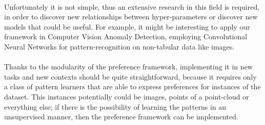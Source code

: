 \paragraph{}
Unfortunately it is not simple, thus an extensive research in this field is required, in order to discover new relationships between hyper-parameters or discover new models that could be useful. \newline
For example, it might be interesting to apply our framework in Computer Vision Anomaly Detection, employing Convolutional Neural Networks for pattern-recognition on non-tabular data like images. 

\paragraph{}
Thanks to the modularity of the preference framework, implementing it in new tasks and new contexts should be quite straightforward, because it requires only a class of pattern learners that are able to express preferences for instances of the dataset. This instances potentially could be images, points of a point-cloud or everything else; if there is the possibility of learning the patterns in an unsupervised manner, then the preference framework can be implemented.